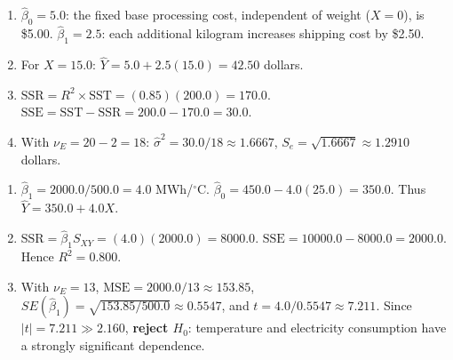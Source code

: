 \begin{solproblema}[prob:e5cf043]
\begin{enumerate}
\item $\hat\beta_0=5.0$: the fixed base processing cost, independent of weight ($X=0$), is \$5.00. $\hat\beta_1=2.5$: each additional kilogram increases shipping cost by \$2.50.
\item For $X=15.0$: $\hat Y=5.0+2.5(15.0)=42.50$ dollars.
\item $\text{SSR}=R^2\times\text{SST}=(0.85)(200.0)=170.0$. $\text{SSE}=\text{SST}-\text{SSR}=200.0-170.0=30.0$.
\item With $\nu_E=20-2=18$: $\hat\sigma^2=30.0/18\approx1.6667$, $S_e=\sqrt{1.6667}\approx1.2910$ dollars.
\end{enumerate}
\end{solproblema}

\begin{solproblema}[prob:5a642fc]
\begin{enumerate}
\item $\hat\beta_1=2000.0/500.0=4.0$ MWh/$^\circ$C. $\hat\beta_0=450.0-4.0(25.0)=350.0$. Thus $\hat Y=350.0+4.0X$.
\item $\text{SSR}=\hat\beta_1S_{XY}=(4.0)(2000.0)=8000.0$. $\text{SSE}=10000.0-8000.0=2000.0$. Hence $R^2=0.800$.
\item With $\nu_E=13$, $\text{MSE}=2000.0/13\approx153.85$, $SE(\hat\beta_1)=\sqrt{153.85/500.0}\approx0.5547$, and $t=4.0/0.5547\approx7.211$. Since $|t|=7.211\gg2.160$, \textbf{reject $H_0$}: temperature and electricity consumption have a strongly significant dependence.
\end{enumerate}
\end{solproblema}

